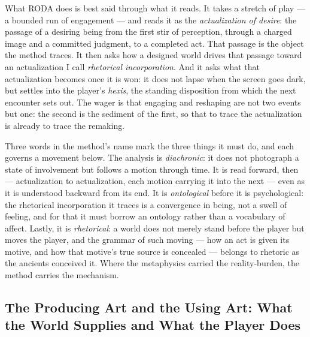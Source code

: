 \documentclass{article}
\begin{document}
What RODA does is best said through what it reads. It takes a stretch of play — a bounded run of engagement — and reads it as the \textit{actualization of desire}: the passage of a desiring being from the first stir of perception, through a charged image and a committed judgment, to a completed act. That passage is the object the method traces. It then asks how a designed world drives that passage toward an actualization I call \textit{rhetorical incorporation}. And it asks what that actualization becomes once it is won: it does not lapse when the screen goes dark, but settles into the player's \textit{hexis}, the standing disposition from which the next encounter sets out. The wager is that engaging and reshaping are not two events but one: the second is the sediment of the first, so that to trace the actualization is already to trace the remaking.

Three words in the method's name mark the three things it must do, and each governs a movement below. The analysis is \textit{diachronic}: it does not photograph a state of involvement but follows a motion through time. It is read forward, then — actualization to actualization, each motion carrying it into the next — even as it is understood backward from its end. It is \textit{ontological} before it is psychological: the rhetorical incorporation it traces is a convergence in being, not a swell of feeling, and for that it must borrow an ontology rather than a vocabulary of affect. Lastly, it is \textit{rhetorical}: a world does not merely stand before the player but moves the player, and the grammar of such moving — how an act is given its motive, and how that motive's true source is concealed — belongs to rhetoric as the ancients conceived it. Where the metaphysics carried the reality-burden, the method carries the mechanism.

\subsection*{The Producing Art and the Using Art: What the World Supplies and What the Player Does}
\end{document}
